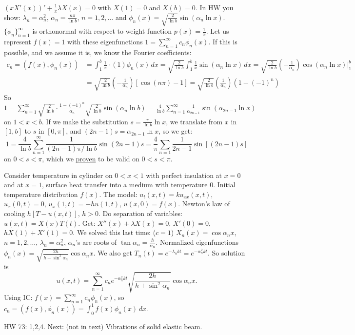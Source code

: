 \documentclass[]{article}
\begin{document}
\begin{example}
	[Done in HW] $(x X'(x))' + \frac{1}{x} \lambda X(x) = 0$ with $X(1) = 0$ and $X(b) = 0$. In HW you show: $\lambda_n = \alpha_n^2$, $\alpha_n = \frac{n\pi}{\ln{b}}$, $n=1,2,\dots$ and $\phi_n(x) = \sqrt{\frac{2}{\ln{b}}}\sin{(\alpha_n \ln{x})}$. $\{\phi_n\}_{n=1}^\infty$ is orthonormal with respect to weight function $p(x) = \frac{1}{x}$. Let us represent $f(x) = 1$ with these eigenfunctions $1 = \sum_{n=1}^\infty c_n \phi_n(x)$. If this is possible, and we assume it is, we know the Fourier coefficients: \begin{align*} c_n = (f(x),\phi_n(x)) &= \int_1^b \frac{1}{x}\cdot(1) \phi_n(x) \, dx = \sqrt{\frac{2}{\ln{b}}} \int_1^b \frac{1}{x} \sin{(\alpha_n \ln{x})} \, dx = \sqrt{\frac{2}{\ln{b}}} \left( -\frac{1}{\alpha_n} \right) \cos{(\alpha_n \ln{x} )} \bigg\rvert_1^b \\ &= \sqrt{ \frac{2}{\ln{b}}} \left(-\frac{1}{\alpha_n} \right) [\cos{(n\pi)}-1] = \sqrt{ \frac{2}{\ln{b}}} \left( \frac{1}{\alpha_n} \right) (1-(-1)^n) \end{align*}
	So $ \displaystyle 1 = \sum_{n=1}^\infty \sqrt{ \frac{2}{\ln{b}}} \cdot \frac{1-(-1)^n}{\alpha_n} \sqrt{ \frac{2}{\ln{b}}} \sin{( \alpha_n \ln{b})} = \frac{4}{\ln{b}} \sum_{n=1}^\infty \frac{1}{\alpha_{2n-1}} \sin{(\alpha_{2n-1} \ln{x})}$ on $1<x<b$.
	If we make the substitution $s = \frac{\pi}{\ln{b}}\ln{x}$, we translate from $x$ in $[1,b]$ to $s$ in $[0,\pi]$, and $(2n-1)s = \alpha_{2n-1} \ln{x}$, so we get: $$ 1 = \frac{4}{\ln{b}} \sum_{n=1}^\infty \frac{1}{(2n-1)\pi/\ln{b}} \sin{(2n-1)s} = \frac{4}{\pi} \sum_{n=1} \frac{1}{2n-1} \sin{[(2n-1)s]} $$ on $0 < s < \pi$, which we \underline{proven} to be valid on $0<s<\pi$.
\end{example}
\begin{example}
	Consider temperature in cylinder on $0<x<1$ with perfect insulation at $x = 0$ and at $x=1$, surface heat transfer into a medium with temperature 0. Initial temperature distribution $f(x)$. The model: $u_t(x,t) = ku_{xx}(x,t)$, $u_x(0,t) = 0$, $u_x(1,t) = -hu(1,t)$, $u(x,0) = f(x)$. Newton's law of cooling $h[T-u(x,t)]$, $h>0$. Do separation of variables: $u(x,t) = X(x) T(t)$. Get: $X''(x) + \lambda X(x) = 0$, $X'(0) = 0$, $hX(1) + X'(1) = 0$. We solved this last time: ($c = 1$) $X_n(x) = \cos{\alpha_n x}$, $n=1,2,\dots$, $\lambda_n = \alpha_n^2$, $\alpha_n$'s are roots of $\tan{\alpha_n} = \frac{h}{\alpha_n}$. Normalized eigenfunctions $\phi_n(x) = \sqrt{ \frac{2h}{h + \sin^2{\alpha_n}}} \cos{\alpha_n x}$. We also get $T_n(t) = e^{-\lambda_n kt} = e^{-\alpha_n^2 kt}$. So solution is $$ u(x,t) = \sum_{n=1}^\infty c_n e^{-\alpha_n^2 kt} \sqrt{ \frac{2h}{h + \sin^2{\alpha_n}}} \cos{\alpha_n x}.$$ Using IC: $f(x) = \sum_{n=1}^\infty c_n \phi_n(x)$, so $c_n = (f(x),\phi_n(x)) = \int_0^1 f(x) \phi_n(x) \, dx$.
\end{example}
HW 73: 1,2,4.
Next: (not in text) Vibrations of solid elastic beam. 
\end{document}
